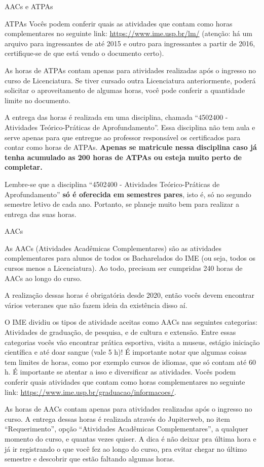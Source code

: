 \begin{secao}{AACs e ATPAs}
\begin{subsecao}{ATPAs}
Vocês podem conferir quais as atividades que contam como horas complementares
no seguinte link: \url{https://www.ime.usp.br/lm/} (atenção: há um arquivo para
ingressantes de até 2015 e outro para ingressantes a partir de 2016,
certifique-se de que está vendo o documento certo).

As horas de ATPAs contam apenas para atividades realizadas após o ingresso no
curso de Licenciatura. Se tiver cursado outra Licenciatura anteriormente, poderá
solicitar o aproveitamento de algumas horas, você pode conferir a quantidade
limite no documento.

A entrega das horas é realizada em uma disciplina, chamada
``4502400 - Atividades Teórico-Práticas de Aprofundamento''. Essa disciplina não
tem aula e serve apenas para que entregue ao professor responsável os certificados
para contar como horas de ATPAs. \bf{Apenas se matricule nessa disciplina caso já}
\bf{tenha acumulado as 200 horas de ATPAs ou esteja muito perto de completar.}

Lembre-se que a disciplina ``4502400 - Atividades Teórico-Práticas de Aprofundamento''
\textbf{só é oferecida em semestres pares}, isto é, só no segundo semestre letivo de cada ano.
Portanto, se planeje muito bem para realizar a entrega das suas horas.

\end{subsecao}

\begin{subsecao}{AACs}

As AACs (Atividades Acadêmicas Complementares) são as atividades complementares
para alunos de todos os Bacharelados do IME (ou seja, todos os cursos menos a
Licenciatura). Ao todo, precisam ser cumpridas 240 horas de AACs ao longo do curso.

A realização dessas horas é obrigatória desde 2020, então vocês devem encontrar
vários veteranes que não fazem ideia da existência disso aí.

O IME dividiu os tipos de atividade aceitas como AACs nas seguintes categorias:
Atividades de graduação, de pesquisa, e de cultura e extensão. Entre essas categorias
vocês vão encontrar prática esportiva, visita a museus, estágio iniciação científica 
e até doar sangue (vale 5 h)!
É importante notar que algumas coisas tem limites de horas, como por exemplo
cursos de idiomas, que só contam até 60 h. É importante se atentar a isso e
diversificar as atividades.
Vocês podem conferir quais atividades que contam como horas complementares
no seguinte link: \url{https://www.ime.usp.br/graduacao/informacoes/}.

As horas de AACs contam apenas para atividades realizadas após o ingresso no curso.
A entrega dessas horas é realizada através do Jupiterweb, no item ``Requerimento'',
opção ``Atividades Acadêmicas Complementares'', a qualquer momento do curso, e
quantas vezes quiser. A dica é não deixar pra última hora e já ir registrando o que
você fez ao longo do curso, pra evitar chegar no último semestre e descobrir que estão
faltando algumas horas.

\end{subsecao}

\end{secao}
